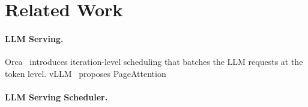 
\section{Related Work}
\label{sec:related_work}
\vspace{-1.5mm}
\noindent\paragraph{LLM Serving.} 
Orca~\cite{orca} introduces iteration-level scheduling that batches the LLM requests at the token level. vLLM~\cite{vllm} proposes PageAttention~\cite{vllm}
\vspace{-0.5mm}
\noindent\paragraph{LLM Serving Scheduler.} 





